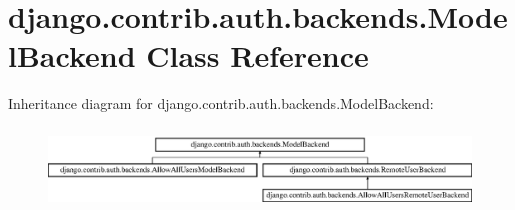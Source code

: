 \hypertarget{classdjango_1_1contrib_1_1auth_1_1backends_1_1_model_backend}{}\section{django.\+contrib.\+auth.\+backends.\+Model\+Backend Class Reference}
\label{classdjango_1_1contrib_1_1auth_1_1backends_1_1_model_backend}
Inheritance diagram for django.\+contrib.\+auth.\+backends.\+Model\+Backend\+:\begin{figure}[H]
\begin{center}
\leavevmode
\includegraphics[height=2.181818cm]{classdjango_1_1contrib_1_1auth_1_1backends_1_1_model_backend}
\end{center}
\end{figure}
